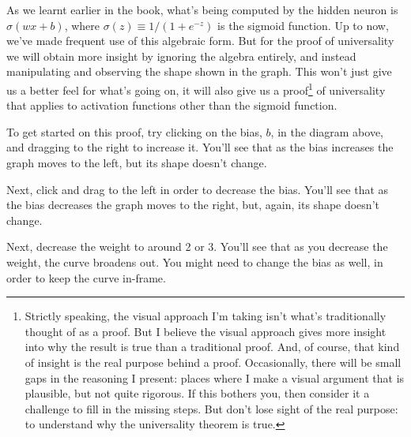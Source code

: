 \documentclass[a4paper,twoside,10pt]{book}
\begin{document}
As we learnt earlier in the book, what's being computed by the hidden neuron is $\sigma(wx+b)$, where $\sigma(z)\equiv1/(1+e^{-z})$ is the sigmoid function. Up to now, we've made frequent use of this algebraic form. But for the proof of universality we will obtain more insight by ignoring the algebra entirely, and instead manipulating and observing the shape shown in the graph. This won't just give us a better feel for what's going on, it will also give us a proof\footnote{Strictly speaking, the visual approach I'm taking isn't what's traditionally thought of as a proof. But I believe the visual approach gives more insight into why the result is true than a traditional proof. And, of course, that kind of insight is the real purpose behind a proof. Occasionally, there will be small gaps in the reasoning I present: places where I make a visual argument that is plausible, but not quite rigorous. If this bothers you, then consider it a challenge to fill in the missing steps. But don't lose sight of the real purpose: to understand why the universality theorem is true.} of universality that applies to activation functions other than the sigmoid function.

To get started on this proof, try clicking on the bias, $b$, in the diagram above, and dragging to the right to increase it. You'll see that as the bias increases the graph moves to the left, but its shape doesn't change.

Next, click and drag to the left in order to decrease the bias. You'll see that as the bias decreases the graph moves to the right, but, again, its shape doesn't change.

Next, decrease the weight to around 2 or 3. You'll see that as you decrease the weight, the curve broadens out. You might need to change the bias as well, in order to keep the curve in-frame.
\end{document}
